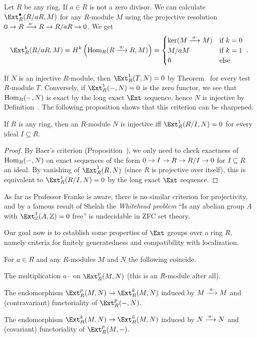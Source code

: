 \documentclass[a4paper,parskip=half,numbers=enddot, DIV=12]{scrreprt}
\begin{document}
\begin{example*}
	Let $R$ be any ring. If $a\in R$ is not a zero divisor. We can calculate $\Ext_R^\bullet(R/aR,M)$ for any $R$-module $M$ using the projective resolution $0\morphism R\morphism[ a\cdot]R\morphism R/aR\morphism 0$. We get
	\begin{align*}
		\Ext_R^k(R/aR,M)=H^k\left(\Hom_R(R\morphism[ a\cdot]R,M)\right)=\begin{cases}
			\ker(M\morphism[ a\cdot]M) & \text{if }k=0\\
			M/aM & \text{if }k=1\\
			0 & \text{else}
		\end{cases}\;.
	\end{align*}
\end{example*}
If $N$ is an injective $R$-module, then $\Ext_R^1(T,N)=0$ by Theorem~ for every test $R$-module $T$. Conversely, if $\Ext_R^1(-,N)=0$ is the zero functor, we see that $\operatorname{Hom}_R(-,N)$ is exact by the long exact $\Ext$ sequence, hence $N$ is injective by Definition~. The following proposition shows that this criterion can be sharpened.
\begin{prop}
	If $R$ is any ring, then an $R$-module $N$ is injective iff $\Ext_R^1(R/I,N)=0$ for every ideal $I\subseteq R$.
\end{prop}
\begin{proof}
	By Baer's criterion (Proposition~), we only need to check exactness of $\operatorname{Hom}_R(-,N)$ on exact sequences of the form $0\morphism I\morphism R\morphism R/I\morphism 0$ for $I\subseteq R$ an ideal. By vanishing of $\Ext_R^1(R,N)$ (since $R$ is projective over itself), this is equivalent to $\Ext_R^1(R/I,N)=0$ by the long exact $\Ext$ sequence.
\end{proof}
\begin{rem*}
	As far as Professor Franke is aware, there is no similar criterion for projectivity, and by a famous result of Shelah the \emph{Whitehead problem} ``Is any abelian group $A$ with $\Ext_\IZ^1(A,\IZ)=0$ free'' is undecidable in ZFC set theory.
\end{rem*}
Our goal now is to establish some properties of $\Ext$ groups over a ring $R$, namely criteria for finitely generatedness and compatibility with localization.
\begin{fact}
	For $a\in R$ and any $R$-modules $M$ and $N$ the following coincide.
	\begin{alphanumerate}
		\item The multiplication $a\cdot $ on $\Ext_R^p(M,N)$ (this is an $R$-module after all).
		\item The endomorphism $\Ext_R^p(M,N)\morphism\Ext_R^k(M,N)$ induced by $M\morphism[ a\cdot]M$ and (contravariant) functoriality of $\Ext_R^p(-,N)$.
		\item The endomorphism $\Ext_R^k(M,N)\morphism\Ext_R^k(M,N)$ induced by $N\morphism[ a\cdot]N$ and (covariant) functoriality of $\Ext_R^p(M,-)$.
	\end{alphanumerate}
\end{fact}
\end{document}

